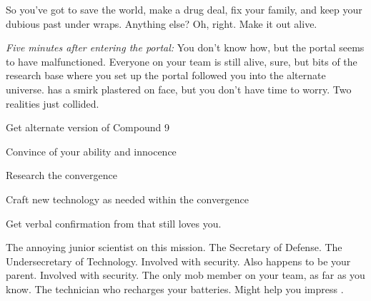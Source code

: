 \documentclass[char]{guildcamp3}
\begin{document}
So you've got to save the world, make a drug deal, fix your family, and keep your dubious past under wraps. Anything else? Oh, right. Make it out alive.

\emph{Five minutes after entering the portal:}
You don't know how, but the portal seems to have malfunctioned. Everyone on your team is still alive, sure, but bits of the research base where you set up the portal followed you into the alternate universe. \cSciOne{} has a smirk plastered on \cSciOne{\their} face, but you don't have time to worry. Two realities  just collided.

\begin{itemz}[Goals]
  \item Get alternate version of Compound 9
  \item Convince \cSciTwo{} of your ability and innocence
  \item Research the convergence
  \item Craft new technology as needed within the convergence
  \item Get verbal confirmation from \cSpecOpOne{} that \cSpecOpOne{\they} still loves you.
\end{itemz}





\begin{contacts}
  \contact{\cSciTwo{}} The annoying junior scientist on this mission.
  \contact{\cPoliOne{}} The Secretary of Defense.
  \contact{\cPoliTwo{}} The Undersecretary of Technology.
  \contact{\cSpecOpOne{}} Involved with security. Also happens to be your parent.
  \contact{\cSpecOpTwo{}} Involved with security. The only mob member on your team, as far as you know.
  \contact{\cTech{}} The technician who recharges your batteries. Might help you impress \cSciTwo{}.
\end{contacts}
\end{document}
